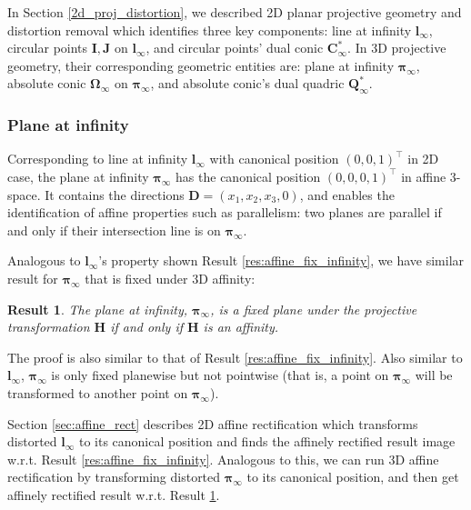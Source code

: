 \documentclass[12pt]{article}
\newtheorem{result}{Result}[section]
\numberwithin{equation}{section}
\begin{document}
In Section \ref{2d_proj_distortion}, we described 2D planar projective geometry and distortion removal which identifies three key components: line at infinity $\mathbf{l}_{\infty}$, circular points $\mathbf{I, J}$ on $\mathbf{l}_{\infty}$, and circular points' dual conic $\mathbf{C}_{\infty}^*$. In 3D projective geometry, their corresponding geometric entities are: plane at infinity $\bm{\pi}_{\infty}$, absolute conic $\bm{\Omega}_{\infty}$ on $\bm{\pi}_{\infty}$, and absolute conic's dual quadric $\mathbf{Q}_{\infty}^*$.

\subsubsection{Plane at infinity}

Corresponding to line at infinity $\mathbf{l}_{\infty}$ with canonical position $(0, 0, 1)^\top$ in 2D case, the plane at infinity $\bm{\pi}_{\infty}$ has the canonical position $(0, 0, 0, 1)^\top$ in affine 3-space. It contains the directions $\mathbf{D} = (x_1, x_2, x_3, 0)$, and enables the identification of affine properties such as parallelism: two planes are parallel if and only if their intersection line is on $\bm{\pi}_{\infty}$.

Analogous to $\mathbf{l}_{\infty}$'s property shown Result \ref{res:affine_fix_infinity}, we have similar result for $\bm{\pi}_{\infty}$ that is fixed under 3D affinity: \\

\begin{result}
The plane at infinity, $\bm{\pi}_{\infty}$, is a fixed plane under the projective transformation $\mathbf{H}$ if and only if $\mathbf{H}$ is an affinity.
\label{res:3d_affine_fix_infinity}
\end{result}

The proof is also similar to that of Result \ref{res:affine_fix_infinity}. Also similar to $\mathbf{l}_{\infty}$, $\bm{\pi}_{\infty}$ is only fixed planewise but not pointwise (that is, a point on $\bm{\pi}_{\infty}$ will be transformed to another point on $\bm{\pi}_{\infty}$). 

Section \ref{sec:affine_rect} describes 2D affine rectification which transforms distorted $\mathbf{l}_{\infty}$ to its canonical position and finds the affinely rectified result image w.r.t. Result \ref{res:affine_fix_infinity}. Analogous to this, we can run 3D affine rectification by transforming distorted $\bm{\pi}_{\infty}$ to its canonical position, and then get affinely rectified result w.r.t. Result \ref{res:3d_affine_fix_infinity}.
\end{document}
